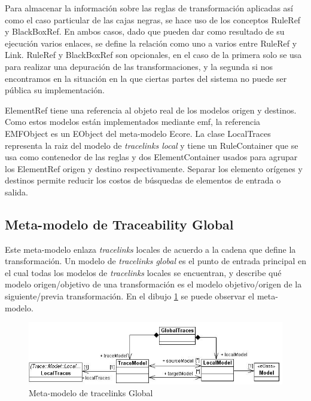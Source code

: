\documentclass[a4paper,12pt,oneside,spanish]{book}
\begin{document}
Para almacenar la información sobre las reglas de transformación aplicadas así como el caso particular de las cajas negras, se hace uso de los conceptos \textsf{RuleRef} y \textsf{BlackBoxRef}. En ambos casos, dado que pueden dar como resultado de su ejecución varios enlaces, se define la relación como uno a varios entre \textsf{RuleRef} y \textsf{Link}. \textsf{RuleRef} y \textsf{BlackBoxRef} son opcionales, en el caso de la primera solo se usa para realizar una depuración de las transformaciones, y la segunda si nos encontramos en la situación en la que ciertas partes del sistema no puede ser pública su implementación.

\textsf{ElementRef} tiene una referencia al objeto real de los modelos origen y destinos. Como estos modelos están implementados mediante \gls{emf}, la referencia \textsf{EMFObject} es un \textsf{EObject} del meta-modelo \textsf{Ecore}. La clase \textsf{LocalTraces} representa la raiz del modelo de \textit{tracelinks local} y tiene un \textsf{RuleContainer} que se usa como contenedor de las reglas y dos \textsf{ElementContainer} usados para agrupar los \textsf{ElementRef} origen y destino respectivamente. Separar los elemento orígenes y destinos permite reducir los costos de búsquedas de elementos de entrada o salida.

\subsection{Meta-modelo de Traceability Global}
\label{subsec:TraceabilityGlobal}

Este meta-modelo enlaza \textit{tracelinks} locales de acuerdo a la cadena que define la transformación. Un modelo de \textit{tracelinks global} es el punto de entrada principal en el cual todas los modelos de \textit{tracelinks} locales se encuentran, y describe qué modelo origen/objetivo de una transformación es el modelo objetivo/origen de la siguiente/previa transformación. En el dibujo \ref{fig:GlobalTraceMetamodel} se puede observar el meta-modelo.

\begin{figure}[hbtp]
\centering
\includegraphics[scale=.62]{./img/GlobalTraceMetamodel}
\caption{Meta-modelo de tracelinks Global}
\label{fig:GlobalTraceMetamodel}
\end{figure}
\end{document}
